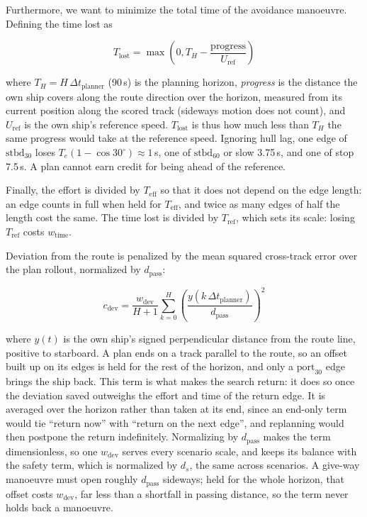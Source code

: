 \documentclass[10pt,a4paper]{article}
\begin{document}
Furthermore, we want to minimize the total time of the avoidance manoeuvre.
Defining the time lost as

\begin{equation}
  T_{\text{lost}} = \max{\left(0, T_H - \frac{\text{progress}}{U_{\text{ref}}}\right)}
\end{equation}

where $T_H = H\,\Delta t_{\text{planner}}$ (90\,s) is the planning horizon, \textit{progress}
is the distance the own ship covers along the route direction over the horizon, measured from its current
position along the scored track (sideways motion does not count), and $U_{\text{ref}}$ is the own ship's
reference speed. $T_{\text{lost}}$ is thus how much less than $T_H$ the same progress would take at the
reference speed. Ignoring hull lag, one edge of $\text{stbd}_{30}$ loses $T_e(1-\cos 30^\circ) \approx 1$\,s,
one of $\text{stbd}_{60}$ or slow 3.75\,s, and one of stop 7.5\,s. A plan cannot earn credit for being ahead
of the reference.

Finally, the effort is divided by $T_{\text{eff}}$ so that it does not depend on the edge length: an edge
counts in full when held for $T_{\text{eff}}$, and twice as many edges of half the length cost the same.
The time lost is divided by $T_{\text{ref}}$, which sets its scale: losing $T_{\text{ref}}$ costs $w_{\text{time}}$.


Deviation from the route is penalized by the mean squared cross-track error over the plan rollout,
normalized by $d_{\text{pass}}$:

\begin{equation}
c_{\text{dev}} = \frac{w_{\text{dev}}}{H+1} \sum_{k=0}^{H} \left(\frac{y(k\,\Delta t_{\text{planner}})}{d_{\text{pass}}}\right)^2
\end{equation}

where $y(t)$ is the own ship's signed perpendicular distance from the route line, positive to starboard.
A plan ends on a track parallel to the route, so an offset built up on its edges is held for the rest of
the horizon, and only a $\text{port}_{30}$ edge brings the ship back. This term is what makes the search
return: it does so once the deviation saved outweighs the effort and time of the return edge. It is
averaged over the horizon rather than taken at its end, since an end-only term would tie ``return now''
with ``return on the next edge'', and replanning would then postpone the return indefinitely.
Normalizing by $d_{\text{pass}}$ makes the term dimensionless, so one $w_{\text{dev}}$ serves every
scenario scale, and keeps its balance with the safety term, which is normalized by $d_s$, the same
across scenarios. A give-way manoeuvre must open roughly $d_{\text{pass}}$ sideways; held for the whole
horizon, that offset costs $w_{\text{dev}}$, far less than a shortfall in passing distance, so the term
never holds back a manoeuvre.
\end{document}
